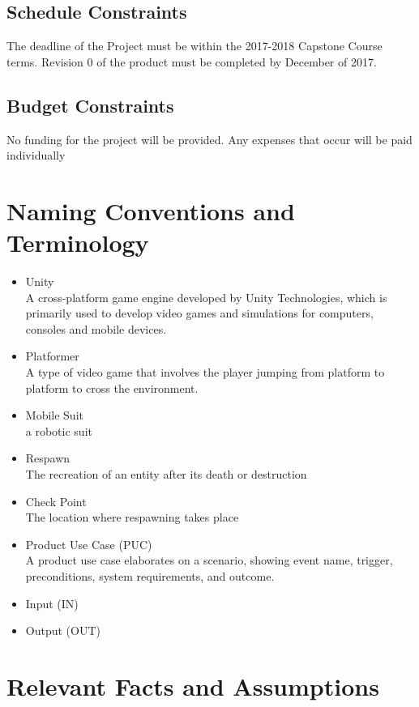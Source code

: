 \documentclass{article}
\begin{document}
    \subsection{Schedule Constraints}
    The deadline of the Project must be within the 2017-2018 Capstone Course terms. Revision 0 of the product must be completed by December of 2017.
    
    \subsection{Budget Constraints}
    No funding for the project will be provided. Any expenses that occur will be paid individually

\section{Naming Conventions and Terminology}
    \begin{itemize}
    
        \item Unity \\ A cross-platform game engine developed by Unity Technologies, which is primarily used to develop video games and simulations for computers, consoles and mobile devices.
        \item Platformer \\
        A type of video game that involves the player jumping from platform to platform to cross the environment.
        \item Mobile Suit \\ a robotic suit 
        \item Respawn \\ The recreation of an entity after its death or destruction
        \item Check Point \\ The location where respawning takes place
        \item Product Use Case (PUC) \\ A product use case elaborates on a scenario, showing event name, trigger, preconditions, system requirements, and outcome.
        \item Input (IN)
        \item  Output (OUT)
    \end{itemize}

\section{Relevant Facts and Assumptions}
\end{document}
